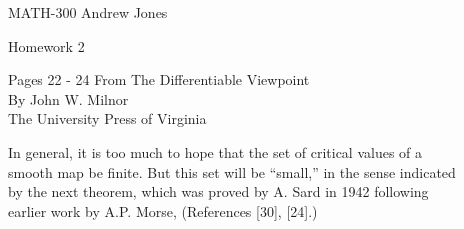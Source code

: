 \documentclass{article}
\begin{document}
  MATH-300 \hfill Andrew Jones
  \begin{center}
    Homework 2
  \end{center}
  \begin{center}
    Pages 22 - 24 From The Differentiable Viewpoint \\
    By John W. Milnor \\
    The University Press of Virginia
  \end{center}
  In general, it is too much to hope that the set of critical values of a \\
  smooth map be finite. But this set will be ``small,'' in the sense indicated \\
  by the next theorem, which was proved by A. Sard in 1942 following \\
  earlier work by A.P. Morse, (References [30], [24].) \\
\end{document}
